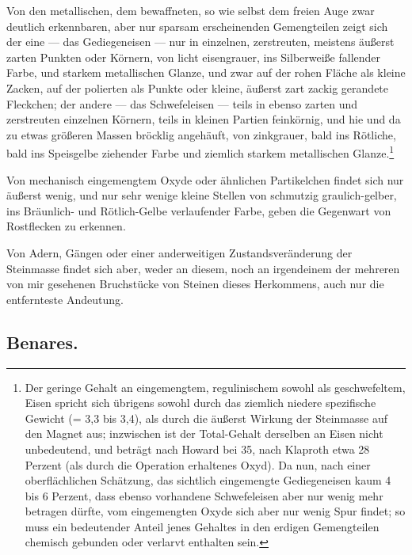 \documentclass[a4paper, 11pt, oneside, german]{article}
\begin{document}
Von den metallischen, dem bewaffneten, so wie selbst dem freien Auge zwar deutlich erkennbaren, aber nur sparsam erscheinenden Gemengteilen zeigt sich der eine --- das Gediegeneisen --- nur in einzelnen, zerstreuten, meistens äußerst zarten Punkten oder Körnern, von licht eisengrauer, ins Silberweiße fallender Farbe, und starkem metallischen Glanze, und zwar auf der rohen Fläche als kleine Zacken, auf der polierten als Punkte oder kleine, äußerst zart zackig gerandete Fleckchen; der andere --- das Schwefeleisen --- teils in ebenso zarten und zerstreuten einzelnen Körnern, teils in kleinen Partien feinkörnig, und hie und da zu etwas größeren Massen bröcklig angehäuft, von zinkgrauer, bald ins Rötliche, bald ins Speisgelbe ziehender Farbe und ziemlich starkem metallischen Glanze.\footnote{Der geringe Gehalt an eingemengtem, regulinischem sowohl als geschwefeltem, Eisen spricht sich übrigens sowohl durch das ziemlich niedere spezifische Gewicht (= 3,3 bis 3,4), als durch die äußerst Wirkung der Steinmasse auf den Magnet aus; inzwischen ist der Total-Gehalt derselben an Eisen nicht unbedeutend, und beträgt nach Howard bei 35, nach Klaproth etwa 28 Perzent (als durch die Operation erhaltenes Oxyd). Da nun, nach einer oberflächlichen Schätzung, das sichtlich eingemengte Gediegeneisen kaum 4 bis 6 Perzent, dass ebenso vorhandene Schwefeleisen aber nur wenig mehr betragen dürfte, vom eingemengten Oxyde sich aber nur wenig Spur findet; so muss ein bedeutender Anteil jenes Gehaltes in den erdigen Gemengteilen chemisch gebunden oder verlarvt enthalten sein.}

Von mechanisch eingemengtem Oxyde oder ähnlichen Partikelchen findet sich nur äußerst wenig, und nur sehr wenige kleine Stellen von schmutzig graulich-gelber, ins Bräunlich- und Rötlich-Gelbe verlaufender Farbe, geben die Gegenwart von Rostflecken zu erkennen.

Von Adern, Gängen oder einer anderweitigen Zustandsveränderung der Steinmasse findet sich aber, weder an diesem, noch an irgendeinem der mehreren von mir gesehenen Bruchstücke von Steinen dieses Herkommens, auch nur die entfernteste Andeutung.

\subsection{Benares.}
\end{document}
